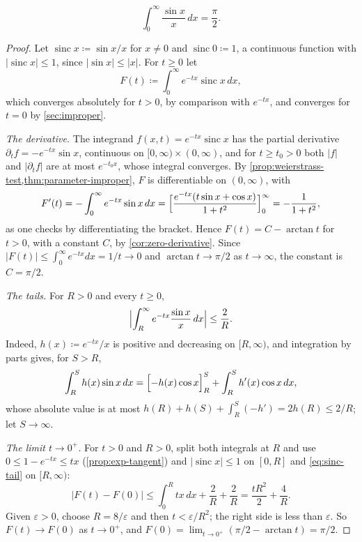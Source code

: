 \begin{theorem}
\label{thm:sinc-integral}
\[
\int_0^\infty\frac{\sin x}x\,dx=\frac\pi2 .
\]
\end{theorem}

\begin{proof}
Let $\operatorname{sinc}x\coloneqq\sin x/x$ for $x\ne0$ and $\operatorname{sinc}0\coloneqq1$, a continuous function with $|\operatorname{sinc}x|\le1$, since $|\sin x|\le|x|$. For $t\ge0$ let
\[
F(t)\coloneqq\int_0^\infty e^{-tx}\operatorname{sinc}x\,dx ,
\]
which converges absolutely for $t>0$, by comparison with $e^{-tx}$, and converges for $t=0$ by \cref{sec:improper}.

\emph{The derivative.} The integrand $f(x,t)=e^{-tx}\operatorname{sinc}x$ has the partial derivative $\partial_tf=-e^{-tx}\sin x$, continuous on $[0,\infty)\times(0,\infty)$, and for $t\ge t_0>0$ both $|f|$ and $|\partial_tf|$ are at most $e^{-t_0x}$, whose integral converges. By \cref{prop:weierstrass-test,thm:parameter-improper}, $F$ is differentiable on $(0,\infty)$, with
\[
F'(t)=-\int_0^\infty e^{-tx}\sin x\,dx=\Bigl[\frac{e^{-tx}(t\sin x+\cos x)}{1+t^2}\Bigr]_0^\infty=-\frac1{1+t^2},
\]
as one checks by differentiating the bracket. Hence $F(t)=C-\arctan t$ for $t>0$, with a constant $C$, by \cref{cor:zero-derivative}. Since $|F(t)|\le\int_0^\infty e^{-tx}dx=1/t\to0$ and $\arctan t\to\pi/2$ as $t\to\infty$, the constant is $C=\pi/2$.

\emph{The tails.} For $R>0$ and every $t\ge0$,
\begin{equation}
\Bigl|\int_R^\infty e^{-tx}\frac{\sin x}x\,dx\Bigr|\le\frac2R .
\label{eq:sinc-tail}
\end{equation}
Indeed, $h(x)\coloneqq e^{-tx}/x$ is positive and decreasing on $[R,\infty)$, and integration by parts gives, for $S>R$,
\[
\int_R^Sh(x)\sin x\,dx=\Bigl[-h(x)\cos x\Bigr]_R^S+\int_R^Sh'(x)\cos x\,dx ,
\]
whose absolute value is at most $h(R)+h(S)+\int_R^S(-h')=2h(R)\le2/R$; let $S\to\infty$.

\emph{The limit $t\to0^+$.} For $t>0$ and $R>0$, split both integrals at $R$ and use $0\le1-e^{-tx}\le tx$ (\cref{prop:exp-tangent}) and $|\operatorname{sinc}x|\le1$ on $[0,R]$ and \eqref{eq:sinc-tail} on $[R,\infty)$:
\[
|F(t)-F(0)|\le\int_0^Rtx\,dx+\frac2R+\frac2R=\frac{tR^2}2+\frac4R .
\]
Given $\varepsilon>0$, choose $R=8/\varepsilon$ and then $t<\varepsilon/R^2$; the right side is less than $\varepsilon$. So $F(t)\to F(0)$ as $t\to0^+$, and $F(0)=\lim_{t\to0^+}(\pi/2-\arctan t)=\pi/2$.
\end{proof}

